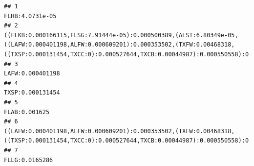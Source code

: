 \documentclass[]{article}
\begin{document}
\begin{verbatim}
## 1                                                                                                                                                                                                                                                                                                                                                                                                                   FLHB:4.0731e-05
## 2                                                                                                                                                                         ((FLKB:0.000166115,FLSG:7.91444e-05):0.000500389,(ALST:6.80349e-05,((LAFW:0.000401198,ALFW:0.000609201):0.000353502,(TXFW:0.00468318,((TXSP:0.000131454,TXCC:0):0.000527644,TXCB:0.00044987):0.000550558):0.00263375):0.000535248):0.0026018):0.000242145
## 3                                                                                                                                                                                                                                                                                                                                                                                                                  LAFW:0.000401198
## 4                                                                                                                                                                                                                                                                                                                                                                                                                  TXSP:0.000131454
## 5                                                                                                                                                                                                                                                                                                                                                                                                                     FLAB:0.001625
## 6                                                                                                                                                                                                                                                                    ((LAFW:0.000401198,ALFW:0.000609201):0.000353502,(TXFW:0.00468318,((TXSP:0.000131454,TXCC:0):0.000527644,TXCB:0.00044987):0.000550558):0.00263375):0.000535248
## 7                                                                                                                                                                                                                                                                                                                                                                                                                    FLLG:0.0165286

\end{verbatim}
\end{document}
